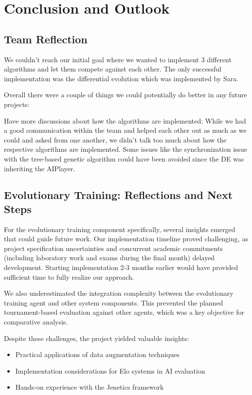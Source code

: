 \documentclass[sigconf]{acmart} %
\begin{document}
\begin{enumerate}
\end{enumerate}

\section{Conclusion and Outlook}

\subsection{Team Reflection}
We couldn’t reach our initial goal where we wanted to implement 3 different algorithms and let them compete against each other. The only successful implementation was the differential evolution which was implemented by Sara.

Overall there were a couple of things we could potentially do better in any future projects:

Have more discussions about how the algorithms are implemented: While we had a good communication within the team and helped each other out as much as we could and asked from one another, we didn’t talk too much about how the respective algorithms are implemented. Some issues like the synchronization issue with the tree-based genetic algorithm could have been avoided since the DE was inheriting the AIPlayer.

\subsection{Evolutionary Training: Reflections and Next Steps}
For the evolutionary training component specifically, several insights emerged that could guide future work. Our implementation timeline proved challenging, as project specification uncertainties and concurrent academic commitments (including laboratory work and exams during the final month) delayed development. Starting implementation 2-3 months earlier would have provided sufficient time to fully realize our approach.

We also underestimated the integration complexity between the evolutionary training agent and other system components. This prevented the planned tournament-based evaluation against other agents, which was a key objective for comparative analysis.

Despite these challenges, the project yielded valuable insights:
\begin{itemize}
	\item Practical applications of data augmentation techniques
	\item Implementation considerations for Elo systems in AI evaluation
	\item Hands-on experience with the Jenetics framework
\end{itemize}
\end{document}
